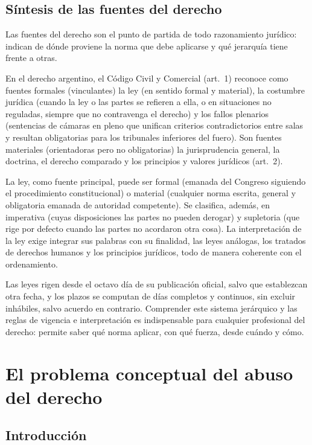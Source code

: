 \documentclass[12pt,oneside]{book}
\begin{document}

\section{Síntesis de las fuentes del derecho}

Las fuentes del derecho son el punto de partida de todo razonamiento jurídico: indican de dónde proviene la norma que debe aplicarse y qué jerarquía tiene frente a otras.

En el derecho argentino, el Código Civil y Comercial (art.~1) reconoce como fuentes formales (vinculantes) la ley (en sentido formal y material), la costumbre jurídica (cuando la ley o las partes se refieren a ella, o en situaciones no reguladas, siempre que no contravenga el derecho) y los fallos plenarios (sentencias de cámaras en pleno que unifican criterios contradictorios entre salas y resultan obligatorias para los tribunales inferiores del fuero). Son fuentes materiales (orientadoras pero no obligatorias) la jurisprudencia general, la doctrina, el derecho comparado y los principios y valores jurídicos (art.~2).

La ley, como fuente principal, puede ser formal (emanada del Congreso siguiendo el procedimiento constitucional) o material (cualquier norma escrita, general y obligatoria emanada de autoridad competente). Se clasifica, además, en imperativa (cuyas disposiciones las partes no pueden derogar) y supletoria (que rige por defecto cuando las partes no acordaron otra cosa). La interpretación de la ley exige integrar sus palabras con su finalidad, las leyes análogas, los tratados de derechos humanos y los principios jurídicos, todo de manera coherente con el ordenamiento.

Las leyes rigen desde el octavo día de su publicación oficial, salvo que establezcan otra fecha, y los plazos se computan de días completos y continuos, sin excluir inhábiles, salvo acuerdo en contrario. Comprender este sistema jerárquico y las reglas de vigencia e interpretación es indispensable para cualquier profesional del derecho: permite saber qué norma aplicar, con qué fuerza, desde cuándo y cómo.
\chapter{El problema conceptual del abuso del derecho}

\section{Introducción}
\end{document}
